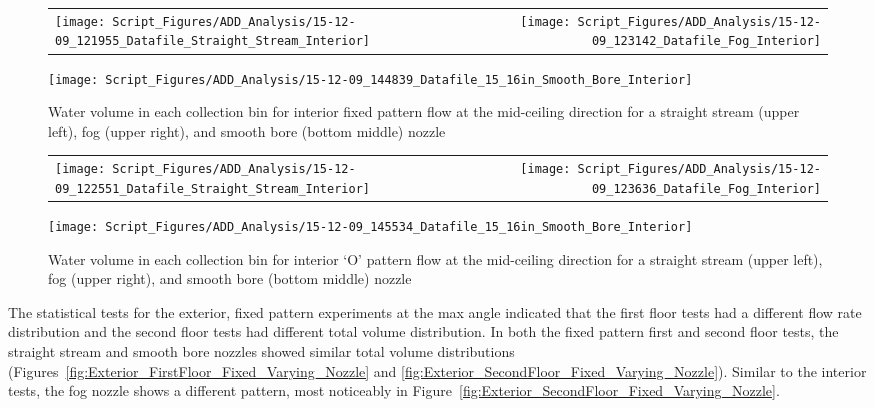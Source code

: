 \documentclass{article}
\begin{document}
\begin{figure}[!ht]
\begin{tabular*}{\textwidth}{lr}
\texttt{[image: Script\_Figures/ADD\_Analysis/15-12-09\_121955\_Datafile\_Straight\_Stream\_Interior]} &
\texttt{[image: Script\_Figures/ADD\_Analysis/15-12-09\_123142\_Datafile\_Fog\_Interior]} \\
\end{tabular*}
\centering
\texttt{[image: Script\_Figures/ADD\_Analysis/15-12-09\_144839\_Datafile\_15\_16in\_Smooth\_Bore\_Interior]}
\caption{Water volume in each collection bin for interior fixed pattern flow at the mid-ceiling direction for a straight stream (upper left), fog (upper right), and smooth bore (bottom middle) nozzle}
\label{fig:Interior_Varying_Nozzle_Types_Fixed_Pattern}
\end{figure}

\begin{figure}[ht]
\begin{tabular*}{\textwidth}{lr}
\texttt{[image: Script\_Figures/ADD\_Analysis/15-12-09\_122551\_Datafile\_Straight\_Stream\_Interior]} &
\texttt{[image: Script\_Figures/ADD\_Analysis/15-12-09\_123636\_Datafile\_Fog\_Interior]} \\
\end{tabular*}
\centering
\texttt{[image: Script\_Figures/ADD\_Analysis/15-12-09\_145534\_Datafile\_15\_16in\_Smooth\_Bore\_Interior]}
\caption{Water volume in each collection bin for interior `O' pattern flow at the mid-ceiling direction for a straight stream (upper left), fog (upper right), and smooth bore (bottom middle) nozzle}
\label{fig:Interior_Varying_Nozzle_Types_O_Pattern}
\end{figure}

\clearpage

The statistical tests for the exterior, fixed pattern experiments at the max angle indicated that the first floor tests had a different flow rate distribution and the second floor tests had different total volume distribution. In both the fixed pattern first and second floor tests, the straight stream and smooth bore nozzles showed similar total volume distributions (Figures~\ref{fig:Exterior_FirstFloor_Fixed_Varying_Nozzle} and \ref{fig:Exterior_SecondFloor_Fixed_Varying_Nozzle}). Similar to the interior tests, the fog nozzle shows a different pattern, most noticeably in Figure~\ref{fig:Exterior_SecondFloor_Fixed_Varying_Nozzle}. 
\end{document}
